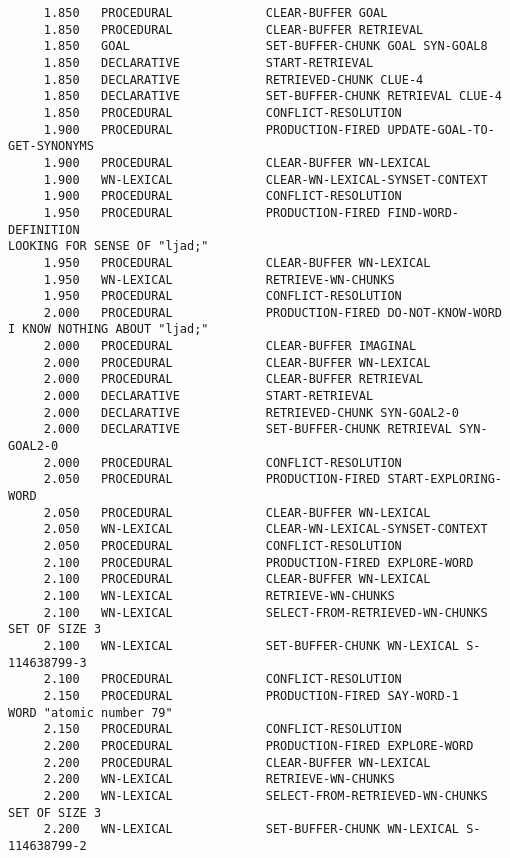 \begin{verbatim}
     1.850   PROCEDURAL             CLEAR-BUFFER GOAL 
     1.850   PROCEDURAL             CLEAR-BUFFER RETRIEVAL 
     1.850   GOAL                   SET-BUFFER-CHUNK GOAL SYN-GOAL8 
     1.850   DECLARATIVE            START-RETRIEVAL 
     1.850   DECLARATIVE            RETRIEVED-CHUNK CLUE-4 
     1.850   DECLARATIVE            SET-BUFFER-CHUNK RETRIEVAL CLUE-4 
     1.850   PROCEDURAL             CONFLICT-RESOLUTION 
     1.900   PROCEDURAL             PRODUCTION-FIRED UPDATE-GOAL-TO-GET-SYNONYMS 
     1.900   PROCEDURAL             CLEAR-BUFFER WN-LEXICAL 
     1.900   WN-LEXICAL             CLEAR-WN-LEXICAL-SYNSET-CONTEXT 
     1.900   PROCEDURAL             CONFLICT-RESOLUTION 
     1.950   PROCEDURAL             PRODUCTION-FIRED FIND-WORD-DEFINITION 
LOOKING FOR SENSE OF "ljad;" 
     1.950   PROCEDURAL             CLEAR-BUFFER WN-LEXICAL 
     1.950   WN-LEXICAL             RETRIEVE-WN-CHUNKS 
     1.950   PROCEDURAL             CONFLICT-RESOLUTION 
     2.000   PROCEDURAL             PRODUCTION-FIRED DO-NOT-KNOW-WORD 
I KNOW NOTHING ABOUT "ljad;" 
     2.000   PROCEDURAL             CLEAR-BUFFER IMAGINAL 
     2.000   PROCEDURAL             CLEAR-BUFFER WN-LEXICAL 
     2.000   PROCEDURAL             CLEAR-BUFFER RETRIEVAL 
     2.000   DECLARATIVE            START-RETRIEVAL 
     2.000   DECLARATIVE            RETRIEVED-CHUNK SYN-GOAL2-0 
     2.000   DECLARATIVE            SET-BUFFER-CHUNK RETRIEVAL SYN-GOAL2-0 
     2.000   PROCEDURAL             CONFLICT-RESOLUTION 
     2.050   PROCEDURAL             PRODUCTION-FIRED START-EXPLORING-WORD 
     2.050   PROCEDURAL             CLEAR-BUFFER WN-LEXICAL 
     2.050   WN-LEXICAL             CLEAR-WN-LEXICAL-SYNSET-CONTEXT 
     2.050   PROCEDURAL             CONFLICT-RESOLUTION 
     2.100   PROCEDURAL             PRODUCTION-FIRED EXPLORE-WORD 
     2.100   PROCEDURAL             CLEAR-BUFFER WN-LEXICAL 
     2.100   WN-LEXICAL             RETRIEVE-WN-CHUNKS 
     2.100   WN-LEXICAL             SELECT-FROM-RETRIEVED-WN-CHUNKS SET OF SIZE 3 
     2.100   WN-LEXICAL             SET-BUFFER-CHUNK WN-LEXICAL S-114638799-3 
     2.100   PROCEDURAL             CONFLICT-RESOLUTION 
     2.150   PROCEDURAL             PRODUCTION-FIRED SAY-WORD-1 
WORD "atomic number 79" 
     2.150   PROCEDURAL             CONFLICT-RESOLUTION 
     2.200   PROCEDURAL             PRODUCTION-FIRED EXPLORE-WORD 
     2.200   PROCEDURAL             CLEAR-BUFFER WN-LEXICAL 
     2.200   WN-LEXICAL             RETRIEVE-WN-CHUNKS 
     2.200   WN-LEXICAL             SELECT-FROM-RETRIEVED-WN-CHUNKS SET OF SIZE 3 
     2.200   WN-LEXICAL             SET-BUFFER-CHUNK WN-LEXICAL S-114638799-2 

\end{verbatim}
